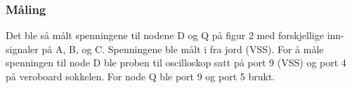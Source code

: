 \subsubsection{Måling}
Det ble så målt spenningene til nodene D og Q på figur 2 med forskjellige inn-signaler på A, B, og C. 
Spenningene ble målt i fra jord (VSS). For å måle spenningen til node D ble proben til oscilloskop satt på port 9 (VSS) og port 4 på veroboard sokkelen. 
For node Q ble port 9 og port 5 brukt.







        
        
        
        
        
